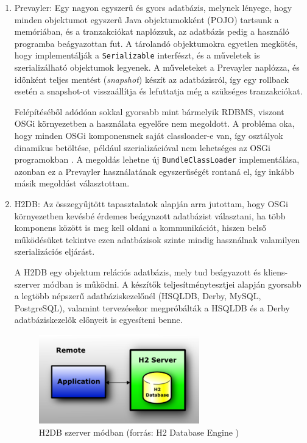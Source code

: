 \begin{enumerate}
	\item Prevayler: Egy nagyon egyszerű és gyors adatbázis, melynek lényege, hogy minden objektumot egyszerű Java objektumokként (POJO) tartsunk a memóriában, és a tranzakciókat naplózzuk, az adatbázis pedig a használó programba beágyazottan fut. A tárolandó objektumokra egyetlen megkötés, hogy implementálják a \texttt{Serializable} interfészt, és a műveletek is szerializálható objektumok legyenek. A műveleteket a Prevayler naplózza, és időnként teljes mentést (\textit{snapshot}) készít az adatbázisról, így egy rollback esetén a snapshot-ot visszaállítja és lefuttatja még a szükséges tranzakciókat.
	
Felépítéséből adódóan sokkal gyorsabb mint bármelyik RDBMS, viszont OSGi környezetben a használata egyelőre nem megoldott. A probléma oka, hogy minden OSGi komponensnek saját classloader-e van, így osztályok dinamikus betöltése, például szerializációval nem lehetséges az OSGi programokban \cite{hall04osgi}. A megoldás lehetne új \texttt{BundleClassLoader} implementálása, azonban ez a Prevayler használatának egyszerűségét rontaná el, így inkább másik megoldást választottam.

    \item H2DB: Az összegyűjtött tapasztalatok alapján arra jutottam, hogy OSGi környezetben kevésbé érdemes beágyazott adatbázist választani, ha több komponens között is meg kell oldani a kommunikációt, hiszen belső működésüket tekintve ezen adatbázisok szinte mindig használnak valamilyen szerializációs eljárást.

    A H2DB egy objektum relációs adatbázis, mely tud beágyazott és kliens-szerver módban is működni. A készítők teljesítménytesztjei alapján gyorsabb a legtöbb népszerű adatbáziskezelőnél (HSQLDB, Derby, MySQL, PostgreSQL), valamint tervezésekor megpróbálták a HSQLDB és a Derby adatbáziskezelők előnyeit is egyesíteni benne.
    
\begin{figure}[htp]
\centering
\includegraphics[scale=1.0]{img/h2db}
\caption{H2DB szerver módban (forrás: H2 Database Engine \cite{h2db})}
\label{fig:h2db}
\end{figure}


\end{enumerate}
